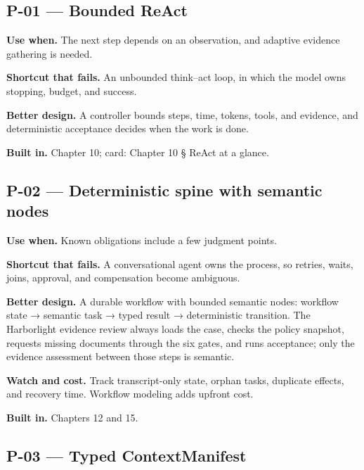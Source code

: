\subsection{P-01 — Bounded ReAct}

\textbf{Use when.} The next step depends on an observation, and adaptive evidence gathering is needed.\par

\textbf{Shortcut that fails.} An unbounded think–act loop, in which the model owns stopping, budget, and success.\par

\textbf{Better design.} A controller bounds steps, time, tokens, tools, and evidence, and deterministic acceptance decides when the work is done.\par

\textbf{Built in.} Chapter 10; card: Chapter 10 § ReAct at a glance.\par

\subsection{P-02 — Deterministic spine with semantic nodes}

\textbf{Use when.} Known obligations include a few judgment points.\par

\textbf{Shortcut that fails.} A conversational agent owns the process, so retries, waits, joins, approval, and compensation become ambiguous.\par

\textbf{Better design.} A durable workflow with bounded semantic nodes: workflow state → semantic task → typed result → deterministic transition. The Harborlight evidence review always loads the case, checks the policy snapshot, requests missing documents through the six gates, and runs acceptance; only the evidence assessment between those steps is semantic.\par

\textbf{Watch and cost.} Track transcript-only state, orphan tasks, duplicate effects, and recovery time. Workflow modeling adds upfront cost.\par

\textbf{Built in.} Chapters 12 and 15.\par

\subsection{P-03 — Typed ContextManifest}

